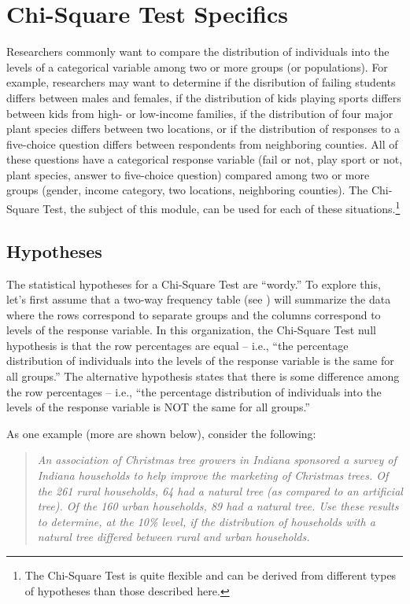 \documentclass[10pt,openany]{book}\usepackage[]{graphicx}\usepackage[]{color}
\begin{document}
\section{Chi-Square Test Specifics}
\vspace{-3pt}
Researchers commonly want to compare the distribution of individuals into the levels of a categorical variable among two or more groups (or populations). For example, researchers may want to determine if the disribution of failing students differs between males and females, if the distribution of kids playing sports differs between kids from high- or low-income families, if the distribution of four major plant species differs between two locations, or if the distribution of responses to a five-choice question differs between respondents from neighboring counties. All of these questions have a categorical response variable (fail or not, play sport or not, plant species, answer to five-choice question) compared among two or more groups (gender, income category, two locations, neighboring counties). The Chi-Square Test, the subject of this module, can be used for each of these situations.\footnote{The Chi-Square Test is quite flexible and can be derived from different types of hypotheses than those described here.}

\subsection{Hypotheses}
\vspace{-3pt}
The statistical hypotheses for a Chi-Square Test are ``wordy.''  To explore this, let's first assume that a two-way frequency table (see ) will summarize the data where the rows correspond to separate groups and the columns correspond to levels of the response variable. In this organization, the Chi-Square Test null hypothesis is that the row percentages are equal -- i.e., ``the percentage distribution of individuals into the levels of the response variable is the same for all groups.''  The alternative hypothesis states that there is some difference among the row percentages -- i.e., ``the percentage distribution of individuals into the levels of the response variable is NOT the same for all groups.''

As one example (more are shown below), consider the following:
\vspace{-6pt}
\begin{quote}
\textsl{An association of Christmas tree growers in Indiana sponsored a survey of Indiana households to help improve the marketing of Christmas trees. Of the 261 rural households, 64 had a natural tree (as compared to an artificial tree). Of the 160 urban households, 89 had a natural tree. Use these results to determine, at the 10\% level, if the distribution of households with a natural tree differed between rural and urban households.}
\end{quote}
\vspace{-3pt}
\end{document}
